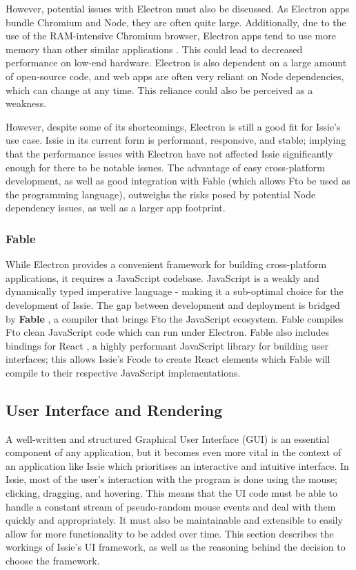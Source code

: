 However, potential issues with Electron must also be discussed. As Electron apps bundle Chromium and Node, they are often quite large. Additionally, due to the use of the RAM-intensive Chromium browser, Electron apps tend to use more memory than other similar applications \cite{roryok}. This could lead to decreased performance on low-end hardware. Electron is also dependent on a large amount of open-source code, and web apps are often very reliant on Node dependencies, which can change at any time. This reliance could also be perceived as a weakness.

However, despite some of its shortcomings, Electron is still a good fit for Issie's use case. Issie in its current form is performant, responsive, and stable; implying that the performance issues with Electron have not affected Issie significantly enough for there to be notable issues. The advantage of easy cross-platform development, as well as good integration with Fable (which allows F\fsharp to be used as the programming language), outweighs the risks posed by potential Node dependency issues, as well as a larger app footprint.

\subsubsection{Fable}
While Electron provides a convenient framework for building cross-platform applications, it requires a JavaScript codebase. JavaScript is a weakly and dynamically typed imperative language - making it a sub-optimal choice for the development of Issie. The gap between development and deployment is bridged by \textbf{Fable} \cite{fableio}, a compiler that brings F\fsharp to the JavaScript ecosystem. Fable compiles F\fsharp to clean JavaScript code which can run under Electron. Fable also includes bindings for React \cite{reactjs}, a highly performant JavaScript library for building user interfaces; this allows Issie's F\fsharp code to create React elements which Fable will compile to their respective JavaScript implementations.

\subsection{User Interface and Rendering}
A well-written and structured Graphical User Interface (GUI) is an essential component of any application, but it becomes even more vital in the context of an application like Issie which prioritises an interactive and intuitive interface. In Issie, most of the user's interaction with the program is done using the mouse; clicking, dragging, and hovering. This means that the UI code must be able to handle a constant stream of pseudo-random mouse events and deal with them quickly and appropriately. It must also be maintainable and extensible to easily allow for more functionality to be added over time. This section describes the workings of Issie's UI framework, as well as the reasoning behind the decision to choose the framework.

